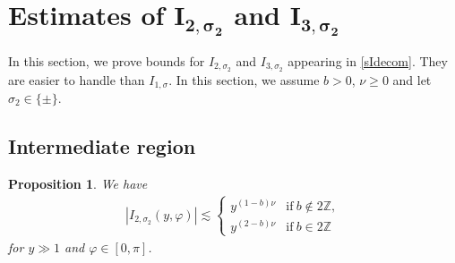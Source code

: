 \documentclass[pdftex]{sigma}
\numberwithin{equation}{section}
\newtheorem{Proposition}[Theorem]{Proposition}
 { \theoremstyle{definition}
\newtheorem{Definition}[Theorem]{Definition}
\newtheorem{Note}[Theorem]{Note}
\newtheorem{Example}[Theorem]{Example}
\newtheorem{Remark}[Theorem]{Remark} }
\def\f{\varphi}
\def\n{\nu}
\def\s{\sigma}
\begin{document}
\section[Estimates of I\_\{2,s\_2\} and I\_\{3,s\_2\}]{Estimates of $\boldsymbol{I_{2,\s_2}}$ and $\boldsymbol{I_{3,\s_2}}$ }

In this section, we prove bounds for $I_{2,\s_2}$ and $I_{3,\s_2}$ appearing in \eqref{sIdecom}. They are easier to handle than $I_{1,\s}$. In this section, we assume $b>0$, $\n\geq 0$ and let $\s_2\in \{\pm\}$.

\subsection{Intermediate region}

\begin{Proposition}\label{I_2prop}
We have
\begin{align*}
|I_{2,\s_2}(y,\f)|\lesssim \begin{cases}
y^{(1-b)\n}& \text{if}\  b\notin 2\mathbb{Z}, \\
y^{(2-b)\n}& \text{if}\  b\in 2\mathbb{Z}
\end{cases}
\end{align*}
for $y\gg 1$ and $\f\in [0,\pi]$.
\end{Proposition}
\end{document}
